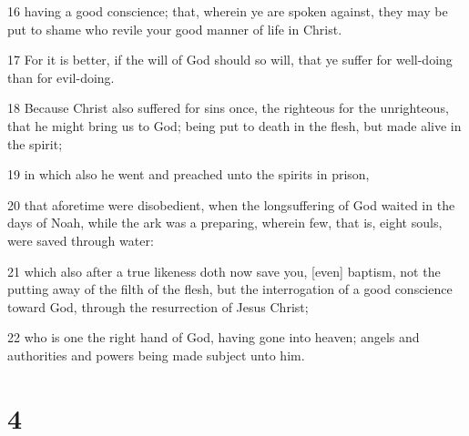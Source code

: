 \par 16 having a good conscience; that, wherein ye are spoken against, they may be put to shame who revile your good manner of life in Christ.
\par 17 For it is better, if the will of God should so will, that ye suffer for well-doing than for evil-doing.
\par 18 Because Christ also suffered for sins once, the righteous for the unrighteous, that he might bring us to God; being put to death in the flesh, but made alive in the spirit;
\par 19 in which also he went and preached unto the spirits in prison,
\par 20 that aforetime were disobedient, when the longsuffering of God waited in the days of Noah, while the ark was a preparing, wherein few, that is, eight souls, were saved through water:
\par 21 which also after a true likeness doth now save you, [even] baptism, not the putting away of the filth of the flesh, but the interrogation of a good conscience toward God, through the resurrection of Jesus Christ;
\par 22 who is one the right hand of God, having gone into heaven; angels and authorities and powers being made subject unto him.

\chapter{4}

